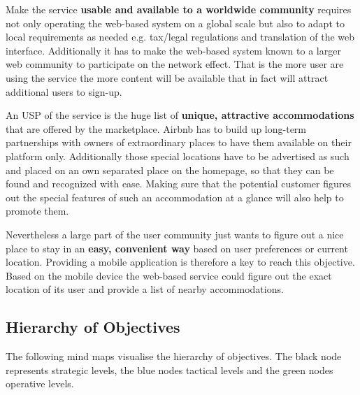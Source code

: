 Make the service {\bf usable and available to a worldwide community} requires not only operating the web-based system on a global scale but also to adapt to local requirements as needed e.g. tax/legal regulations and translation of the web interface. Additionally it has to make the web-based system known to a larger web community to participate on the network effect. That is the more user are using the service the more content will be available that in fact will attract additional users to sign-up.
\vspace{0.2cm}

An USP of the service is the huge list of {\bf unique, attractive accommodations} that are offered by the marketplace. Airbnb has to build up long-term partnerships with owners of extraordinary places to have them available on their platform only. Additionally those special locations have to be advertised as such and placed on an own separated place on the homepage, so that they can be found and recognized with ease. Making sure that the potential customer figures out the special features of such an accommodation at a glance will also help to promote them.
\vspace{0.2cm}

Nevertheless a large part of the user community just wants to figure out a nice place to stay in an {\bf easy, convenient way} based on user preferences or current location. Providing a mobile application is therefore a key to reach this objective. Based on the mobile device the web-based service could figure out the exact location of its user and provide a list of nearby accommodations.

\subsection{Hierarchy of Objectives} %
\label{sec:hierarchy_objectives}
The following mind maps visualise the hierarchy of objectives. The black node represents strategic levels, the blue nodes tactical levels and the green nodes operative levels.

\vspace*{\fill}

